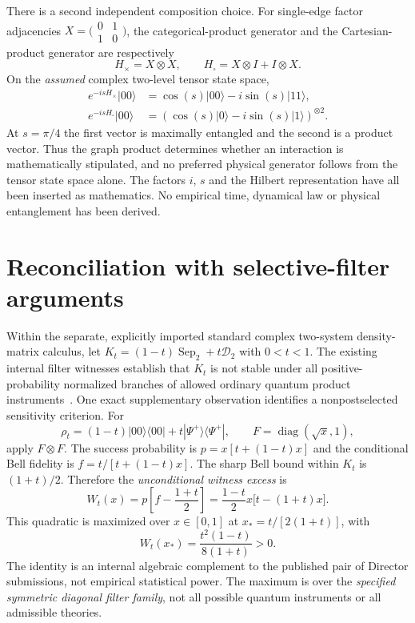 \documentclass[11pt]{article}
\begin{document}
There is a second independent composition choice. For single-edge factor adjacencies $X=\bigl(\begin{smallmatrix}0&1\\1&0\end{smallmatrix}\bigr)$, the categorical-product generator and the Cartesian-product generator are respectively
\[
 H_\times=X\otimes X,\qquad H_\square=X\otimes I+I\otimes X.
\]
On the \emph{assumed} complex two-level tensor state space,
\begin{align*}
 e^{-isH_\times}|00\rangle
   &=\cos(s)|00\rangle-i\sin(s)|11\rangle,\\
 e^{-isH_\square}|00\rangle
   &=(\cos(s)|0\rangle-i\sin(s)|1\rangle)^{\otimes2}.
\end{align*}
At $s=\pi/4$ the first vector is maximally entangled and the second is a product vector. Thus the graph product determines whether an interaction is mathematically stipulated, and no preferred physical generator follows from the tensor state space alone. The factors $i$, $s$ and the Hilbert representation have all been inserted as mathematics. No empirical time, dynamical law or physical entanglement has been derived.

\section{Reconciliation with selective-filter arguments}
Within the separate, explicitly imported standard complex two-system density-matrix calculus, let
$K_t=(1-t)\operatorname{Sep}_2+t\mathcal D_2$ with $0<t<1$. The existing internal filter witnesses establish that $K_t$ is not stable under all positive-probability normalized branches of allowed ordinary quantum product instruments~\cite{A3,B3}. One exact supplementary observation identifies a nonpostselected sensitivity criterion. For
\[
 \rho_t=(1-t)|00\rangle\langle00|+t|\Psi^+\rangle\langle\Psi^+|,
 \qquad F=\operatorname{diag}(\sqrt{x},1),
\]
apply $F\otimes F$. The success probability is $p=x[t+(1-t)x]$ and the conditional Bell fidelity is $f=t/[t+(1-t)x]$. The sharp Bell bound within $K_t$ is $(1+t)/2$. Therefore the \emph{unconditional witness excess} is
\[
 W_t(x)=p\left[f-\frac{1+t}{2}\right]
 =\frac{1-t}{2}x\big[t-(1+t)x\big].
\]
This quadratic is maximized over $x\in[0,1]$ at $x_*=t/[2(1+t)]$, with
\begin{equation}
 W_t(x_*)=\frac{t^2(1-t)}{8(1+t)}>0. \label{eq:filter}
\end{equation}
The identity is an internal algebraic complement to the published pair of Director submissions, not empirical statistical power. The maximum is over the \emph{specified symmetric diagonal filter family}, not all possible quantum instruments or all admissible theories.
\end{document}
